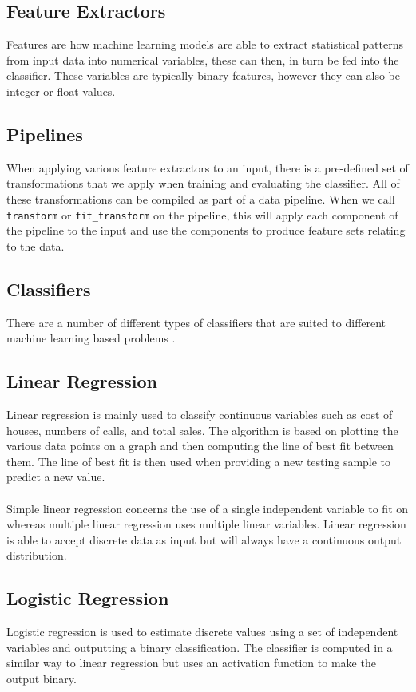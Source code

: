 \documentclass[12pt,twoside]{report}
\begin{document}
\subsection{Feature Extractors}
Features are how machine learning models are able to extract statistical patterns from input data into numerical variables, these can then, in turn be fed into the classifier. These variables are typically binary features, however they can also be integer or float values.
\subsection{Pipelines}
When applying various feature extractors to an input, there is a pre-defined set of transformations that we apply when training and evaluating the classifier. All of these transformations can be compiled as part of a data pipeline. When we call \texttt{transform} or \texttt{fit\_transform} on the pipeline, this will apply each component of the pipeline to the input and use the components to produce feature sets relating to the data.
\subsection{Classifiers}
There are a number of different types of classifiers that are suited to different machine learning based problems \cite{mlclassifiers}.
\subsection{Linear Regression}
Linear regression is mainly used to classify continuous variables such as cost of houses, numbers of calls, and total sales. The algorithm is based on plotting the various data points on a graph and then computing the line of best fit between them. The line of best fit is then used when providing a new testing sample to predict a new value.
\\\\
Simple linear regression concerns the use of a single independent variable to fit on whereas multiple linear regression uses multiple linear variables. Linear regression is able to accept discrete data as input but will always have a continuous output distribution.
\subsection{Logistic Regression}
Logistic regression is used to estimate discrete values using a set of independent variables and outputting a binary classification. The classifier is computed in a similar way to linear regression but uses an activation function to make the output binary.
\end{document}
